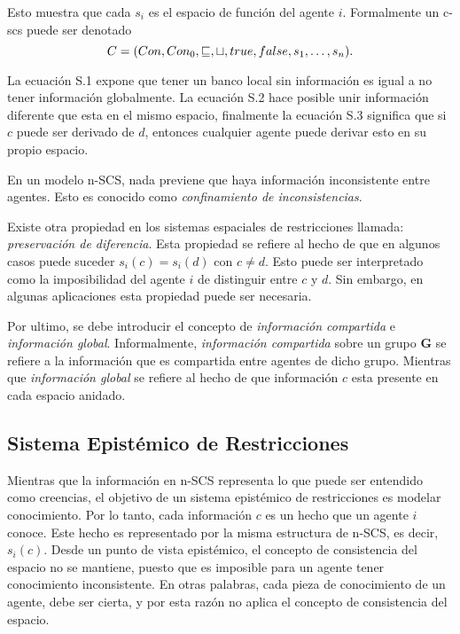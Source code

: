 Esto muestra que cada $s_i$ es el espacio de funci\'on del agente $i$. Formalmente un c-scs puede ser denotado \[C = (Con, Con_0, \sqsubseteq, \sqcup, true, false, s_1, \mathellipsis, s_n).\] 

La ecuaci\'on S.1 expone que tener un banco local sin informaci\'on es igual a no tener informaci\'on globalmente.  La ecuaci\'on S.2 hace posible unir informaci\'on diferente que esta en el mismo espacio, finalmente la ecuaci\'on S.3 significa que si $c$ puede ser derivado de $d$, entonces cualquier agente puede derivar esto en su propio espacio.

En un modelo n-SCS, nada previene que haya informaci\'on inconsistente entre agentes. Esto es conocido como \textit{confinamiento de inconsistencias}.

Existe otra propiedad en los sistemas espaciales de restricciones llamada: \textit{preservaci\'on de diferencia}. Esta propiedad se refiere al hecho de que en algunos casos puede suceder $s_i(c)=s_i(d)$ con $c\neq d$. Esto puede ser interpretado como la imposibilidad del agente $i$ de distinguir entre $c$ y $d$. Sin embargo, en algunas aplicaciones esta propiedad puede ser necesaria.

Por ultimo, se debe introducir el concepto de \textit{informaci\'on compartida} e \textit{informaci\'on global}. Informalmente, \textit{informaci\'on compartida} sobre un grupo \textbf{G} se refiere a la informaci\'on que es compartida entre agentes de dicho grupo. Mientras que \textit{informaci\'on global} se refiere al hecho de que informaci\'on $c$ esta presente en cada espacio anidado.

\subsection{Sistema Epist\'emico de Restricciones}
\label{sepr.cap3}

Mientras que la informaci\'on en n-SCS representa lo que puede ser entendido como creencias, el objetivo de un sistema epist\'emico de restricciones es modelar conocimiento. Por lo tanto, cada informaci\'on $c$ es un hecho que un agente $i$ conoce. Este hecho es representado por la misma estructura de n-SCS, es decir, $s_i(c)$. Desde un punto de vista epist\'emico, el concepto de consistencia del espacio no se mantiene, puesto que es imposible para un agente tener conocimiento inconsistente. En otras palabras, cada pieza de conocimiento de un agente, debe ser cierta, y por esta raz\'on no aplica el concepto de consistencia del espacio.

